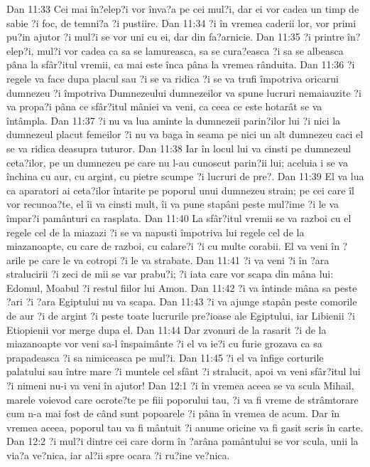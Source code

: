 Dan 11:33  Cei mai în?elep?i vor înva?a pe cei mul?i, dar ei vor cadea un timp de sabie ?i foc, de temni?a ?i pustiire.
Dan 11:34  ?i în vremea caderii lor, vor primi pu?in ajutor ?i mul?i se vor uni cu ei, dar din fa?arnicie.
Dan 11:35  ?i printre în?elep?i, mul?i vor cadea ca sa se lamureasca, sa se cura?easca ?i sa se albeasca pâna la sfâr?itul vremii, ca mai este înca pâna la vremea rânduita.
Dan 11:36  ?i regele va face dupa placul sau ?i se va ridica ?i se va trufi împotriva oricarui dumnezeu ?i împotriva Dumnezeului dumnezeilor va spune lucruri nemaiauzite ?i va propa?i pâna ce sfâr?itul mâniei va veni, ca ceea ce este hotarât se va întâmpla.
Dan 11:37  ?i nu va lua aminte la dumnezeii parin?ilor lui ?i nici la dumnezeul placut femeilor ?i nu va baga în seama pe nici un alt dumnezeu caci el se va ridica deasupra tuturor.
Dan 11:38  Iar în locul lui va cinsti pe dumnezeul ceta?ilor, pe un dumnezeu pe care nu l-au cunoscut parin?ii lui; aceluia i se va închina cu aur, cu argint, cu pietre scumpe ?i lucruri de pre?.
Dan 11:39  El va lua ca aparatori ai ceta?ilor întarite pe poporul unui dumnezeu strain; pe cei care îl vor recunoa?te, el îi va cinsti mult, îi va pune stapâni peste mul?ime ?i le va împar?i pamânturi ca rasplata.
Dan 11:40  La sfâr?itul vremii se va razboi cu el regele cel de la miazazi ?i se va napusti împotriva lui regele cel de la miazanoapte, cu care de razboi, cu calare?i ?i cu multe corabii. El va veni în ?arile pe care le va cotropi ?i le va strabate.
Dan 11:41  ?i va veni ?i în ?ara stralucirii ?i zeci de mii se var prabu?i; ?i iata care vor scapa din mâna lui: Edomul, Moabul ?i restul fiilor lui Amon.
Dan 11:42  ?i va întinde mâna sa peste ?ari ?i ?ara Egiptului nu va scapa.
Dan 11:43  ?i va ajunge stapân peste comorile de aur ?i de argint ?i peste toate lucrurile pre?ioase ale Egiptului, iar Libienii ?i Etiopienii vor merge dupa el.
Dan 11:44  Dar zvonuri de la rasarit ?i de la miazanoapte vor veni sa-l înspaimânte ?i el va ie?i cu furie grozava ca sa prapadeasca ?i sa nimiceasca pe mul?i.
Dan 11:45  ?i el va înfige corturile palatului sau între mare ?i muntele cel sfânt ?i stralucit, apoi va veni sfâr?itul lui ?i nimeni nu-i va veni în ajutor!
Dan 12:1  ?i în vremea aceea se va scula Mihail, marele voievod care ocrote?te pe fiii poporului tau, ?i va fi vreme de strâmtorare cum n-a mai fost de când sunt popoarele ?i pâna în vremea de acum. Dar în vremea aceea, poporul tau va fi mântuit ?i anume oricine va fi gasit scris în carte.
Dan 12:2  ?i mul?i dintre cei care dorm în ?arâna pamântului se vor scula, unii la via?a ve?nica, iar al?ii spre ocara ?i ru?ine ve?nica.
